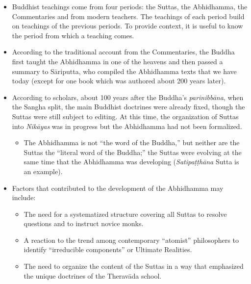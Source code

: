 \begin{itemize}

\item Buddhist teachings come from four periods: the Suttas, the Abhidhamma, the Commentaries and from modern teachers. The teachings of each period build on teachings of the previous periods. To provide context, it is useful to know the period from which a teaching comes.

\item According to the traditional account from the Commentaries, the Buddha first taught the Abhidhamma in one of the heavens and then passed a summary to Sāriputta, who compiled the Abhidhamma texts that we have today (except for one book which was authored about 200 years later).

\item According to scholars, about 100 years after the Buddha’s \textit{parinibbāna}, when the Sangha split, the main Buddhist doctrines were already fixed, though the Suttas were still subject to editing. At this time, the organization of Suttas into \textit{Nikāyas} was in progress but the Abhidhamma had not been formalized.

\begin{itemize}

\item The Abhidhamma is not “the word of the Buddha,” but neither are the Suttas the “literal word of the Buddha;” the Suttas were evolving at the same time that the Abhidhamma was developing (\textit{Satipaṭṭhāna} Sutta is an example).

\end{itemize}

\item Factors that contributed to the development of the Abhidhamma may include:

\begin{itemize}

\item The need for a systematized structure covering all Suttas to resolve questions and to instruct novice monks.

\item A reaction to the trend among contemporary “atomist” philosophers to identify “irreducible components” or Ultimate Realities.

\item The need to organize the content of the Suttas in a way that emphasized the unique doctrines of the Theravāda school.


\end{itemize}
\end{itemize}
